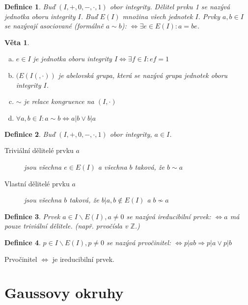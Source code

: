 \documentclass[a4paper, 11pt]{report}
\newtheorem{mydef}{Definice}[chapter]
\newtheorem{veta}{Věta}
\begin{document}
\begin{mydef}
Buď $(I, +, 0, -, \cdot, 1)$ obor integrity. Dělitel prvku 1 se nazývá jednotka oboru integrity $I$. Buď $E(I)$ množina všech jednotek $I$. Prvky $a, b \in I$ se nazývají asociované (formálně $a \sim b$): $\Leftrightarrow \exists e \in E(I): a = be$.
\end{mydef}

\begin{veta}
\begin{enumerate}[a)]
	\item $e \in I$ je jednotka oboru integrity $I \Leftrightarrow \exists f \in I: ef = 1$
	\item $(E(I(, \cdot))$ je abelovská grupa, která se nazývá grupa jednotek oboru integrity  $I$.
	\item $\sim$ je relace kongruence na $(I, \cdot)$
	\item $\forall a, b \in I: a \sim b \Leftrightarrow a|b \lor b|a$
\end{enumerate}
\end{veta}

\begin{mydef}
Buď $(I, +, 0, -, \cdot, 1)$ obor integrity, $a \in I$.
\begin{description}
	\item[Triviální dělitelé prvku $a$] jsou všechna $e \in E(I)$ a všechna $b$ taková, že $b \sim a$
	\item[Vlastní dělitelé prvku $a$] jsou všechna $b$ taková, že $b | a, b \not\in E(I)$ a $b \not\sim a$
\end{description}
\end{mydef}

\begin{mydef}
Prvek $a \in I \backslash E(I), a \not= 0$ se nazývá ireducibilní prvek: $\Leftrightarrow a$ má pouze triviální dělitele. (např. prvočísla v $\mathbb{Z}$.)
\end{mydef}

\begin{mydef}
$p \in I \backslash E(I), p \not= 0$ se nazývá prvočinitel: $\Leftrightarrow p|ab \Rightarrow p|a \lor p|b$
\end{mydef}

Prvočinitel $\Leftrightarrow$ je ireducibilní prvek.

\section{Gaussovy okruhy}
\end{document}
